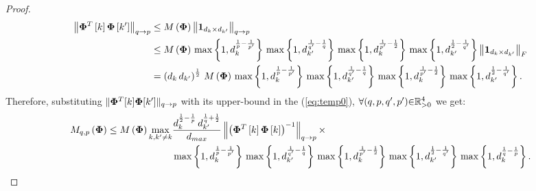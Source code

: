 \begin{proof}
\begin{gather}
\label{eq:UB-kk'}
\begin{aligned}
\left\lVert\boldsymbol{\Phi}^T \left[ k \right] \boldsymbol{\Phi} \left[ k' \right]\right\rVert_{q \to p} &\leq 
M\left( \boldsymbol{\Phi} \right) \left\lVert\boldsymbol{1}_{d_k \times d_{k'}}\right\rVert_{q \to p} \\
&\leq M\left( \boldsymbol{\Phi} \right) \, \max \left\lbrace 1 , d_k^{\frac1p - \frac{1}{p'}} \right\rbrace \, \max \left\lbrace 1 , d_{k'}^{\frac{1}{q'} - \frac1q} \right\rbrace \, \max \left\lbrace 1 , d_k^{\frac{1}{p'} -\frac12} \right\rbrace \, \max \left\lbrace 1 , d_{k'}^{\frac{1}{2} - \frac{1}{q'}} \right\rbrace \left\lVert\boldsymbol{1}_{d_k \times d_{k'}}\right\rVert_F \\
&= \left( d_k \, d_{k'} \right)^{\frac12} \, M\left( \boldsymbol{\Phi} \right) \, \max \left\lbrace 1 , d_k^{\frac1p - \frac{1}{p'}} \right\rbrace \, \max \left\lbrace 1 , d_{k'}^{\frac{1}{q'} - \frac1q} \right\rbrace \, \max \left\lbrace 1 , d_k^{\frac{1}{p'} -\frac12} \right\rbrace \, \max \left\lbrace 1 , d_{k'}^{\frac{1}{2} - \frac{1}{q'}} \right\rbrace. \\
\end{aligned}
\end{gather}
Therefore, substituting $\Vert \boldsymbol{\Phi}^T [k] \boldsymbol{\Phi} [k'] \Vert_{q \to p}$ with its upper-bound in the (\ref{eq:temp0}), $\forall (q , p , q' , p') {\in} \mathbb{R}^4_{{>} 0}$ we get: 
\begin{gather}
\begin{aligned}
\label{eq:temp1} 
M_{q,p}\left( \boldsymbol{\Phi} \right) \leq 
M\left( \boldsymbol{\Phi} \right) \displaystyle\max_{k,k' \neq k} &\frac{d_{k}^{\frac12 - \frac1p} \, d_{k'}^{\frac1q + \frac12}}{d_{max}} \left\lVert\left( \boldsymbol{\Phi}^T \left[ k \right] \boldsymbol{\Phi} \left[ k \right] \right)^{-1}\right\rVert_{q \to p} \times \\
&\max \left\lbrace 1 , d_k^{\frac1p - \frac{1}{p'}} \right\rbrace \, \max \left\lbrace 1 , d_{k'}^{\frac{1}{q'} - \frac1q} \right\rbrace \, \max \left\lbrace 1 , d_k^{\frac{1}{p'} -\frac12} \right\rbrace  \, \max \left\lbrace 1 , d_{k'}^{\frac{1}{2} - \frac{1}{q'}} \right\rbrace \, \max \left\lbrace 1 , d_k^{\frac1q - \frac1p} \right\rbrace.
\end{aligned}
\end{gather}


\end{proof}
